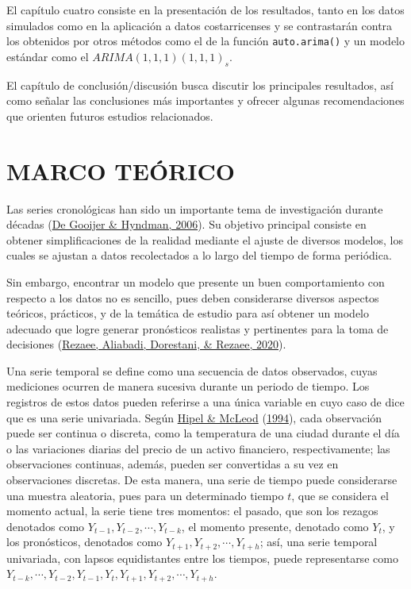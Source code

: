 \documentclass[
]{article}
\begin{document}
El capítulo cuatro consiste en la presentación de los resultados, tanto
en los datos simulados como en la aplicación a datos costarricenses y se
contrastarán contra los obtenidos por otros métodos como el de la
función \texttt{auto.arima()} y un modelo estándar como el
\(ARIMA(1,1,1)(1,1,1)_s\).

El capítulo de conclusión/discusión busca discutir los principales
resultados, así como señalar las conclusiones más importantes y ofrecer
algunas recomendaciones que orienten futuros estudios relacionados.

\newpage

\section{MARCO TEÓRICO}

Las series cronológicas han sido un importante tema de investigación
durante décadas (\protect\hyperlink{ref-tsa_decades}{De Gooijer \&
Hyndman, 2006}). Su objetivo principal consiste en obtener
simplificaciones de la realidad mediante el ajuste de diversos modelos,
los cuales se ajustan a datos recolectados a lo largo del tiempo de
forma periódica.

Sin embargo, encontrar un modelo que presente un buen comportamiento con
respecto a los datos no es sencillo, pues deben considerarse diversos
aspectos teóricos, prácticos, y de la temática de estudio para así
obtener un modelo adecuado que logre generar pronósticos realistas y
pertinentes para la toma de decisiones
(\protect\hyperlink{ref-tsa_decision_making}{Rezaee, Aliabadi,
Dorestani, \& Rezaee, 2020}).

Una serie temporal se define como una secuencia de datos observados,
cuyas mediciones ocurren de manera sucesiva durante un periodo de
tiempo. Los registros de estos datos pueden referirse a una única
variable en cuyo caso de dice que es una serie univariada. Según
\protect\hyperlink{ref-Hipel}{Hipel \& McLeod}
(\protect\hyperlink{ref-Hipel}{1994}), cada observación puede ser
continua o discreta, como la temperatura de una ciudad durante el día o
las variaciones diarias del precio de un activo financiero,
respectivamente; las observaciones continuas, además, pueden ser
convertidas a su vez en observaciones discretas. De esta manera, una
serie de tiempo puede considerarse una muestra aleatoria, pues para un
determinado tiempo \(t\), que se considera el momento actual, la serie
tiene tres momentos: el pasado, que son los rezagos denotados como
\(Y_{t-1}, Y_{t-2}, \cdots, Y_{t-k}\), el momento presente, denotado
como \(Y_t\), y los pronósticos, denotados como
\(Y_{t+1}, Y_{t+2}, \cdots, Y_{t+h}\); así, una serie temporal
univariada, con lapsos equidistantes entre los tiempos, puede
representarse como
\(Y_{t-k}, \cdots, Y_{t-2}, Y_{t-1}, Y_t, Y_{t+1}, Y_{t+2}, \cdots, Y_{t+h}\).
\end{document}
